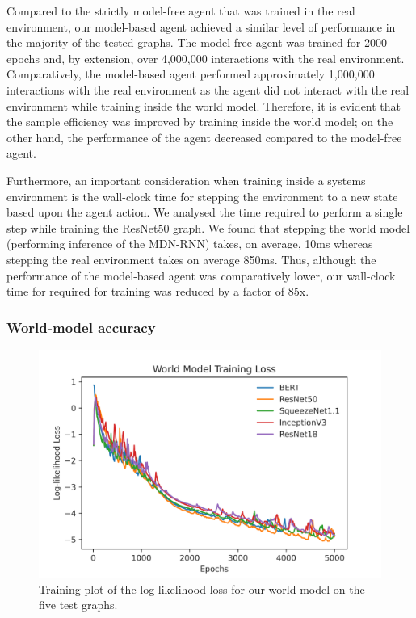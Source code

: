 Compared to the strictly model-free agent that was trained in the real environment, our model-based agent achieved a similar level of performance in the majority of the tested graphs. The model-free agent was trained for 2000 epochs and, by extension, over 4,000,000 interactions with the real environment. Comparatively, the model-based agent performed approximately 1,000,000 interactions with the real environment as the agent did not interact with the real environment while training inside the world model. Therefore, it is evident that the sample efficiency was improved by training inside the world model; on the other hand, the performance of the agent decreased compared to the model-free agent.

Furthermore, an important consideration when training inside a systems environment is the wall-clock time for stepping the environment to a new state based upon the agent action. We analysed the time required to perform a single step while training the ResNet50 graph. We found that stepping the world model (performing inference of the MDN-RNN) takes, on average, 10ms whereas stepping the real environment takes on average 850ms. Thus, although the performance of the model-based agent was comparatively lower, our wall-clock time for required for training was reduced by a factor of 85x.

\subsubsection{World-model accuracy}
\label{sec:eval:subsubsec:wm-acc}

\begin{figure}[h]
  \centering
  \includegraphics[width=1\columnwidth]{sections/5evaluation/images/mb_training_loss.png}
  \caption[Log-likelihood loss of world models]{Training plot of the log-likelihood loss for our world model on the five test graphs.}
  \label{fig:eval:world-model-loss}
\end{figure}

